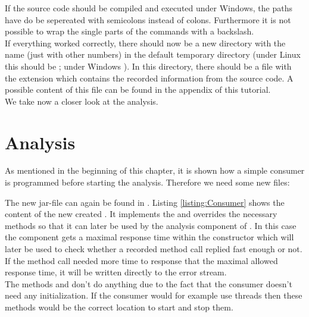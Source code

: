 		\warning If the source code should be compiled and executed under Windows, the paths have do be sepereated with semicolons instead of colons. Furthermore it is not possible to wrap the single parts of the commands with a backslash.\\
		If everything worked correctly, there should now be a new directory with the name  (just with other numbers) in the default temporary directory (under Linux this should be ; under Windows ). In this directory, there should be a file with the extension  which contains the recorded information from the source code. A possible content of this file can be found in the appendix of this tutorial.\\
		We take now a closer look at the analysis.

	\section{Analysis}\label{sec:example:analysis}
		As mentioned in the beginning of this chapter, it is shown how a simple consumer is programmed before starting the analysis. Therefore we need some new files:

		
		The new jar-file can again be found in . Listing \ref{listing:Consumer} shows the content of the new created . It implements the  and overrides the necessary methods so that it can later be used by the analysis component of \Kieker. In this case the component gets a maximal response time within the constructor which will later be used to check whether a recorded method call replied fast enough or not. If the method call needed more time to response that the maximal allowed response time, it will be written directly to the error stream.\\
		The methods  and  don't do anything due to the fact that the consumer doesn't need any initialization. If the consumer would for example use threads then these methods would be the correct location to start and stop them.

